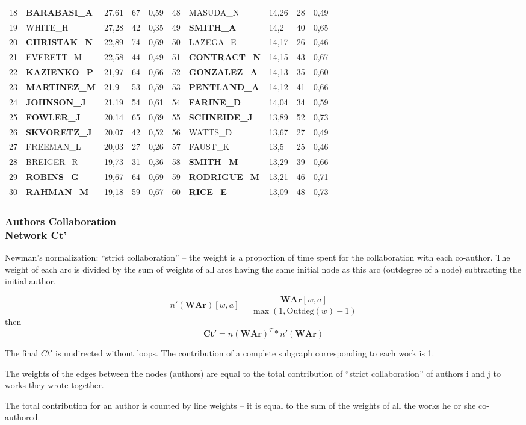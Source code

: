 \documentclass[hyperref={pdfstartview={FitBH -32768},
                         pdfpagemode=FullScreen,
                         plainpages=false,
                         colorlinks=true}
              ]{beamer}
\begin{document}
\begin{frame}[fragile]
\begin{tabular}{c|l|p{0.4cm}|p{0.6cm}|p{0.4cm}||c|l|p{0.4cm}|p{0.6cm}|p{0.4cm}|}
18& 	\textbf{BARABASI\_A}& 	27,61& 	67& 	0,59& 	48& 	MASUDA\_N& 	14,26& 	28& 	0,49\\
19& 	WHITE\_H& 	27,28& 	42& 	0,35& 	49& 	\textbf{SMITH\_A}& 	14,2& 	40& 	0,65\\
20& 	\textbf{CHRISTAK\_N}& 	22,89& 	74& 	0,69& 	50& 	LAZEGA\_E& 	14,17& 	26& 	0,46\\
21& 	EVERETT\_M& 	22,58& 	44& 	0,49& 	51& 	\textbf{CONTRACT\_N}& 	14,15& 	43& 	0,67\\
22& 	\textbf{KAZIENKO\_P}& 	21,97& 	64& 	0,66& 	52& 	\textbf{GONZALEZ\_A}& 	14,13& 	35& 	0,60\\
23& 	\textbf{MARTINEZ\_M}& 	21,9& 	53& 	0,59& 	53& 	\textbf{PENTLAND\_A}& 	14,12& 	41& 	0,66\\
24& 	\textbf{JOHNSON\_J}& 	21,19& 	54& 	0,61& 	54& 	\textbf{FARINE\_D}& 	14,04& 	34& 	0,59\\
25& 	\textbf{FOWLER\_J}& 	20,14& 	65& 	0,69& 	55& 	\textbf{SCHNEIDE\_J}& 	13,89& 	52& 	0,73\\
26& 	\textbf{SKVORETZ\_J}& 	20,07& 	42& 	0,52& 	56& 	WATTS\_D& 	13,67& 	27& 	0,49\\
27& 	FREEMAN\_L& 	20,03& 	27& 	0,26& 	57& 	FAUST\_K& 	13,5& 	25& 	0,46\\
28& 	BREIGER\_R& 	19,73& 	31& 	0,36& 	58& 	\textbf{SMITH\_M}& 	13,29& 	39& 	0,66\\
29& 	\textbf{ROBINS\_G}& 	19,67& 	64& 	0,69& 	59& 	\textbf{RODRIGUE\_M}& 	13,21& 	46& 	0,71\\
30& 	\textbf{RAHMAN\_M}& 	19,18& 	59& 	0,67& 	60& 	\textbf{RICE\_E}& 	13,09& 	48& 	0,73\\
\end{tabular}

\end{frame}

\begin{frame}[fragile]
\frametitle{Authors Collaboration\\ \normalsize Network Ct'}
\footnotesize

Newman's normalization: “strict collaboration”  -- the weight is a proportion of time spent for the collaboration with each co-author. The weight of each arc is divided by the sum of weights of all arcs having the same initial node as this arc (outdegree of a node) subtracting the initial author.

\[ n'(\mathbf{WAr})[w,a] = \frac{\mathbf{WAr}[w,a]}{\max(1,\textrm{Outdeg}(w)-1)}\]
then 
\[ \mathbf{Ct'} = n(\mathbf{WAr})^T * n'(\mathbf{WAr}) \] 

\medskip

The final $Ct'$ is undirected without loops. The contribution of a complete subgraph corresponding to each work is 1. 

The weights of the edges between the nodes (authors) are equal to the total contribution of “strict collaboration” of authors i and j to works they wrote together.

The total contribution for an author is counted by line weights -- it is equal to the sum of the weights of all the works he or she co-authored. 

\end{frame}
\end{document}
